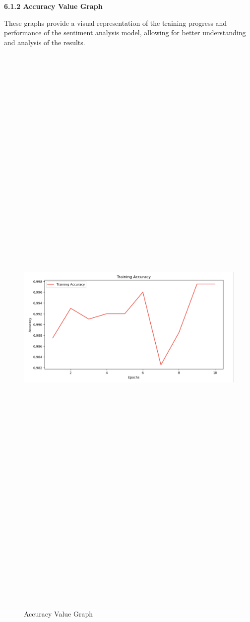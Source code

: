 \documentclass[a4paper,12pt]{article}
\begin{document}
{{{\newpage
  \begin{flushleft}
			\fontsize{13}{15}\selectfont\textbf{6.1.2 Accuracy Value Graph}
			\label{avg}
		\end{flushleft}

  These graphs provide a visual representation of the training progress and performance of the sentiment analysis model, allowing for better understanding and analysis of the results.

\begin{figure}[htbp]
			\centering
			\includegraphics[width=6in, height=15in, keepaspectratio]{trainingacc.png}
			\label{acc}
			\caption{Accuracy Value Graph }
		\end{figure}

}}}
\end{document}
